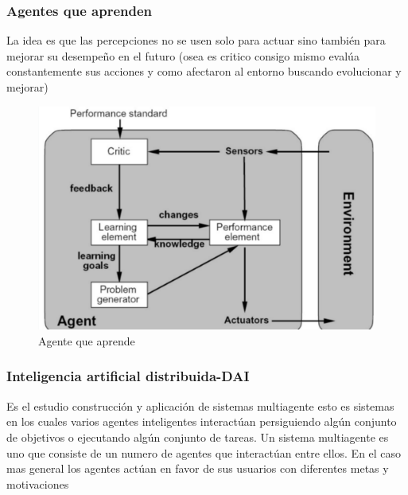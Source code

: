 \subsubsection*{Agentes que aprenden}
La idea es que las percepciones no se usen solo para actuar sino también para mejorar su desempeño en el futuro (osea es critico consigo mismo evalúa constantemente sus acciones y como afectaron al entorno buscando evolucionar y mejorar)

\begin{figure}
  \centering
  \includegraphics[width=16cm, scale=1]{Images/Imagenes/AgenteQueAprende.png}
  \caption{Agente que aprende}
\end{figure}

\subsubsection*{Inteligencia artificial distribuida-DAI}
Es el estudio construcción y aplicación de sistemas multiagente esto es sistemas en los cuales varios agentes inteligentes interactúan persiguiendo algún conjunto de objetivos o ejecutando algún conjunto de tareas. Un sistema multiagente es uno que consiste de un numero de agentes que interactúan entre ellos. En el caso mas general los agentes actúan en favor de sus usuarios con diferentes metas y motivaciones

